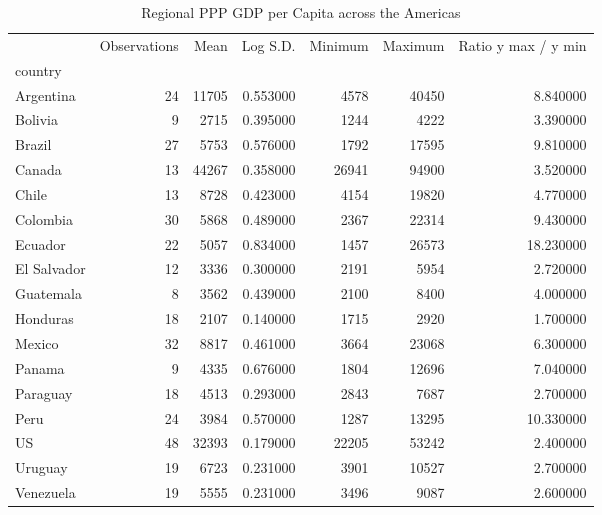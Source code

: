 \begin{table}
\caption{Regional PPP GDP per Capita across the Americas}
\label{tab:regional_gdp}
\begin{tabular}{lrrrrrr}
\toprule
 & Observations & Mean & Log S.D. & Minimum & Maximum & Ratio y max / y min \\
country &  &  &  &  &  &  \\
\midrule
Argentina & 24 & 11705 & 0.553000 & 4578 & 40450 & 8.840000 \\
Bolivia & 9 & 2715 & 0.395000 & 1244 & 4222 & 3.390000 \\
Brazil & 27 & 5753 & 0.576000 & 1792 & 17595 & 9.810000 \\
Canada & 13 & 44267 & 0.358000 & 26941 & 94900 & 3.520000 \\
Chile & 13 & 8728 & 0.423000 & 4154 & 19820 & 4.770000 \\
Colombia & 30 & 5868 & 0.489000 & 2367 & 22314 & 9.430000 \\
Ecuador & 22 & 5057 & 0.834000 & 1457 & 26573 & 18.230000 \\
El Salvador & 12 & 3336 & 0.300000 & 2191 & 5954 & 2.720000 \\
Guatemala & 8 & 3562 & 0.439000 & 2100 & 8400 & 4.000000 \\
Honduras & 18 & 2107 & 0.140000 & 1715 & 2920 & 1.700000 \\
Mexico & 32 & 8817 & 0.461000 & 3664 & 23068 & 6.300000 \\
Panama & 9 & 4335 & 0.676000 & 1804 & 12696 & 7.040000 \\
Paraguay & 18 & 4513 & 0.293000 & 2843 & 7687 & 2.700000 \\
Peru & 24 & 3984 & 0.570000 & 1287 & 13295 & 10.330000 \\
US & 48 & 32393 & 0.179000 & 22205 & 53242 & 2.400000 \\
Uruguay & 19 & 6723 & 0.231000 & 3901 & 10527 & 2.700000 \\
Venezuela & 19 & 5555 & 0.231000 & 3496 & 9087 & 2.600000 \\
\bottomrule
\end{tabular}
\end{table}
